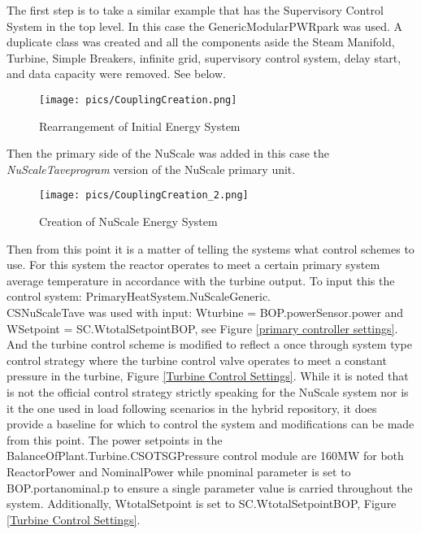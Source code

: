 The first step is to take a similar example that has the Supervisory Control System in the top level. In this case the GenericModularPWR\textunderscore park was used. A duplicate class was created and all the components aside the Steam Manifold, Turbine, Simple Breakers, infinite grid, supervisory control system, delay start, and data capacity were removed. See below.

\begin{figure}[hbtp]
\centering
\texttt{[image: pics/CouplingCreation.png]}
\caption{Rearrangement of Initial Energy System}
\label{coupling park}
\end{figure}

Then the primary side of the NuScale was added in this case the \textit{NuScale\textunderscore Taveprogram} version of the NuScale primary unit.

\begin{figure}[hbtp]
\centering
\texttt{[image: pics/CouplingCreation\_2.png]}
\caption{Creation of NuScale Energy System}
\label{NuScale park}
\end{figure}

Then from this point it is a matter of telling the systems what control schemes to use. For this system the reactor operates to meet a certain primary system average temperature in accordance with the turbine output. To input this the control system: PrimaryHeatSystem.NuScaleGeneric.\\ CS\textunderscore NuScale\textunderscore Tave was used with input:
W\textunderscore turbine = BOP.powerSensor.power and W\textunderscore Setpoint  =  SC.W\textunderscore totalSetpoint\textunderscore BOP, see Figure \ref{primary controller settings}.  And the turbine control scheme is modified to reflect a once through system type control strategy where the turbine control valve operates to meet a constant pressure in the turbine, Figure \ref{Turbine Control Settings}. While it is noted that is not the official control strategy strictly speaking for the NuScale system nor is it the one used in load following scenarios in the hybrid repository, it does provide a baseline for which to control the system and modifications can be made from this point.  The power setpoints in the BalanceOfPlant.Turbine.CS\textunderscore OTSG\textunderscore Pressure control module are 160MW for both Reactor\textunderscore Power and Nominal\textunderscore Power while p\textunderscore nominal parameter is set to BOP.port\textunderscore a\textunderscore nominal.p to ensure a single parameter value is carried throughout the system. Additionally, W\textunderscore totalSetpoint is set to SC.W\textunderscore totalSetpoint\textunderscore BOP, Figure \ref{Turbine Control Settings}.

